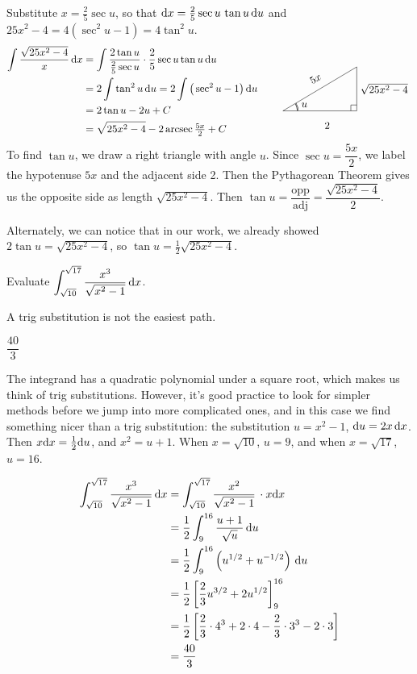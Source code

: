 \begin{solution}
Substitute $x=\frac{2}{5}\sec u$, so that
$\mathrm{d}x=\frac{2}{5} \sec u\,\tan u\,\mathrm{d}u$ and
$25 x^2-4 = 4(\sec^2u-1) = 4\tan^2u$.
\begin{align*}
\int \frac{\sqrt{25x^2-4}}{x}\,\dee{x}
&=\int \frac{2\tan u}{\frac{2}{5}\sec u}\cdot\frac{2}{5}\sec u\tan u\,\dee{u} \\
&=2\int \tan^2 u\,\dee{u}
=2\int \big(\sec^2 u -1\big)\,\dee{u} \\
&= 2\tan u -2u + C \\
&=\sqrt{25x^2-4}-2\arcsec\tfrac{5x}{2}  + C
\hskip0.75in\smash{
\trigtri{u}{2}{\sqrt{25x^2-4}}{5x}}
\end{align*}
To find $\tan u$, we draw a right triangle with angle $u$. Since $\sec u =\dfrac{5x}{2}$, we label the hypotenuse $5x$ and the adjacent side 2. Then the Pythagorean Theorem gives us the opposite side as length $\sqrt{25x^2-4}$. Then $\tan u = \dfrac{\mbox{opp}}{\mbox{adj}} = \dfrac{\sqrt{25x^2-4}}{2}$.

Alternately, we can notice that in our work, we already showed $2\tan u = \sqrt{25x^2-4}$, so $\tan u = \frac{1}{2}\sqrt{25x^2-4} .$
\end{solution}


\begin{question}
Evaluate $\displaystyle\int_{\sqrt{10}}^{\sqrt{17}} \frac{x^3}{\sqrt{x^2-1}}\, \mathrm{d}x$.
\end{question}
\begin{hint}
A trig substitution is not the easiest path.
\end{hint}
\begin{answer}
$\dfrac{40}{3}$
\end{answer}
\begin{solution}
The integrand has a quadratic polynomial under a square root, which makes us think of trig substitutions. However, it's good practice to look for simpler methods before we jump into more complicated ones, and in this case we find something nicer than a trig substitution: the substitution $u=x^2-1$, $\mathrm{d}u=2x\,\mathrm{d}x$. Then $x\mathrm{d}x = \frac{1}{2}\mathrm{d}u$, and $x^2 ={u+1}$. When $x=\sqrt{10}$, $u=9$, and when $x=\sqrt{17}$, $u=16$.

\begin{align*}
\int_{\sqrt{10}}^{\sqrt{17}} \frac{x^3}{\sqrt{x^2-1}}\, \mathrm{d}x&=
\int_{\sqrt{10}}^{\sqrt{17}} \frac{x^2}{\sqrt{x^2-1}}\, \cdot x\mathrm{d}x
\\&=\frac{1}{2}
\int_{9}^{16} \frac{u+1}{\sqrt{u}}\,\mathrm{d}u\\
&=\frac{1}{2}
\int_{9}^{16}\left(u^{1/2}+u^{-1/2}\right)\,\mathrm{d}u
\\&=\frac{1}{2}\left[\frac{2}{3}u^{3/2} + 2u^{1/2}
\right]_{9}^{16}
\\&=\frac{1}{2}\left[\frac{2}{3}\cdot 4^3 + 2\cdot 4
-\frac{2}{3}\cdot 3^3 -2\cdot 3
\right]\\
&=\frac{40}{3}
\end{align*}
\end{solution}

